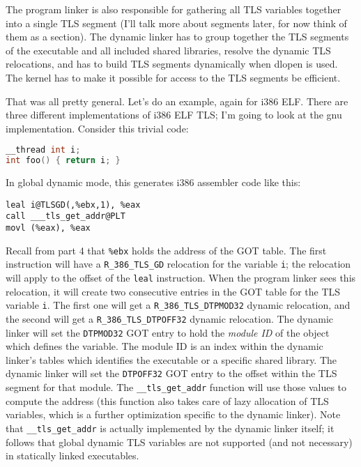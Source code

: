 The program linker is also responsible for gathering all TLS variables together
into a single TLS segment (I'll talk more about segments later, for now think
of them as a section). The dynamic linker has to group together the TLS
segments of the executable and all included shared libraries, resolve the
dynamic TLS relocations, and has to build TLS segments dynamically when dlopen
is used. The kernel has to make it possible for access to the TLS segments be
efficient.

That was all pretty general. Let's do an example, again for i386 ELF\@. There
are three different implementations of i386 ELF TLS; I'm going to look at the
gnu implementation. Consider this trivial code:

\begin{lstlisting}[language=C]
__thread int i;
int foo() { return i; }
\end{lstlisting}

In global dynamic mode, this generates i386 assembler code like this:


\begin{lstlisting}
leal i@TLSGD(,%ebx,1), %eax
call ___tls_get_addr@PLT
movl (%eax), %eax
\end{lstlisting}

Recall from part 4 that \texttt{\%ebx} holds the address of the GOT table.
The first instruction will have a \texttt{R\_386\_TLS\_GD} relocation for
the variable \texttt{i}; the relocation will apply to the offset of the
\texttt{leal} instruction. When the program linker sees this relocation, it
will create two consecutive entries in the GOT table for the TLS variable
\texttt{i}. The first one will get a \texttt{R\_386\_TLS\_DTPMOD32} dynamic
relocation, and the second will get a \texttt{R\_386\_TLS\_DTPOFF32} dynamic
relocation. The dynamic linker will set the \texttt{DTPMOD32} GOT entry to
hold the \emph{module ID} of the object which defines the variable. The
module ID is an index within the dynamic linker's tables which identifies
the executable or a specific shared library. The dynamic linker will set the
\texttt{DTPOFF32} GOT entry to the offset within the TLS segment for that
module. The \texttt{\_\_tls\_get\_addr} function will use those values to
compute the address (this function also takes care of lazy allocation of TLS
variables, which is a further optimization specific to the dynamic linker).
Note that \texttt{\_\_tls\_get\_addr} is actually implemented by the dynamic
linker itself; it follows that global dynamic TLS variables are not supported
(and not necessary) in statically linked executables.

